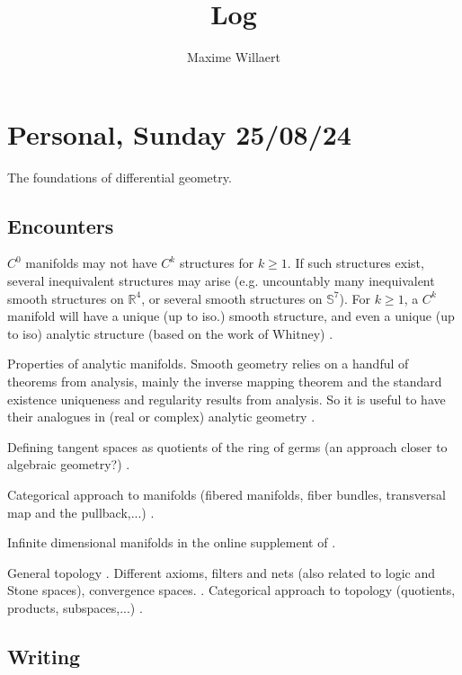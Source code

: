 \documentclass[a4paper,12pt,parskip=half*,chapterprefix=true,numbers=noendperiod]{scrreprt}
\title{Log}
\author{Maxime Willaert}
\theoremstyle{definition}
\theoremstyle{remark}
\begin{document}
\maketitle

\tableofcontents

\section{Personal, Sunday 25/08/24}

The foundations of differential geometry.

\subsection{Encounters}

$C^0$ manifolds may not have $C^k$ structures for $k\geq 1$. If such structures exist, several inequivalent structures may arise (e.g. uncountably many inequivalent smooth structures on $\mathbb{R}^4$, or several smooth structures on $\mathbb{S}^7$). For $k\geq 1$, a $C^k$ manifold will have a unique (up to iso.) smooth structure, and even a unique (up to iso) analytic structure (based on the work of Whitney) \cite{Overflow:ManifoldAnalyticStructure,Stack:WhitneyAnalyticEmbedding}.

Properties of analytic manifolds. Smooth geometry relies on a handful of theorems from analysis, mainly the inverse mapping theorem and the standard existence uniqueness and regularity results from analysis. So it is useful to have their analogues in (real or complex) analytic geometry \cite{Narasimhan:AnalysisRealComplexMan,Bourbaki:VarietesDiffAnalytic}.

Defining tangent spaces as quotients of the ring of germs (an approach closer to algebraic geometry?) \cite{Warner:DiffMan}.

Categorical approach to manifolds (fibered manifolds, fiber bundles, transversal map and the pullback,...) \cite{KMS:NatDiffGeo}.

Infinite dimensional manifolds in the online supplement of \cite{Lee:ManDiffGeo}.

General topology \cite{Munkres:Top}. Different axioms, filters and nets (also related to logic and Stone spaces), convergence spaces. \cite{Wiki:AxiomTop,Wiki:FiltersTop,Wiki:ConvergenceSpace}. Categorical approach to topology (quotients, products, subspaces,...) \cite{Lee:IntTopMan}.

\subsection{Writing}
\end{document}
